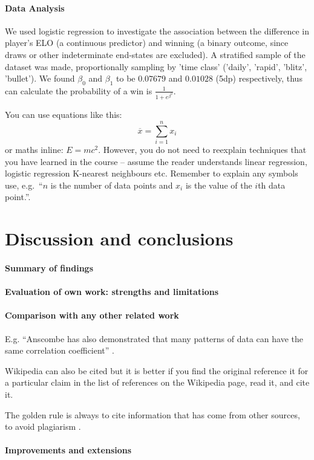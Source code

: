 \documentclass[11pt,a4paper]{article}
\begin{document}

\paragraph{Data Analysis}
We used logistic regression to investigate the association between the difference in player's ELO (a continuous predictor) and winning (a binary outcome, since draws or other indeterminate end-states are excluded).
A stratified sample of the dataset was made, proportionally sampling by 'time class' ('daily', 'rapid', 'blitz', 'bullet').
We found $\beta_{0}$ and $\beta_{1}$ to be $0.07679$ and $0.01028$ (5dp) respectively, thus can calculate the probability of a win is $\displaystyle\frac{1}{1+e^{\beta^{0}}}$.



You can use equations like this:
\begin{equation}
  \label{fds-project-template:eq:1}
  \overline{x} = \sum_{i=1}^n x_i
\end{equation}
or maths inline: $E=mc^2$. However, you do not need to reexplain techniques that you have learned in the course -- assume the reader understands linear regression, logistic regression K-nearest neighbours etc.  Remember to explain any symbols use, e.g.~``$n$ is the number of data points and $x_i$ is the value of the $i$th data point.''.

\section{Discussion and conclusions}

\paragraph{Summary of findings}

\paragraph{Evaluation of own work: strengths and limitations}

\paragraph{Comparison with any other related work}
E.g. ``Anscombe has also demonstrated that many patterns of data can
have the same correlation coefficient'' \cite{anscombe1973graphs}.

Wikipedia can also be cited but it is better if you find the original
reference it for a particular claim in the list of references on the
Wikipedia page, read it, and cite it.

The golden rule is always to cite information that has come from other
sources, to avoid plagiarism \cite{wiki:plagarism}. \cite{HowMuchDoesEloMatter}

\paragraph{Improvements and extensions}


\printbibliography
\end{document}
